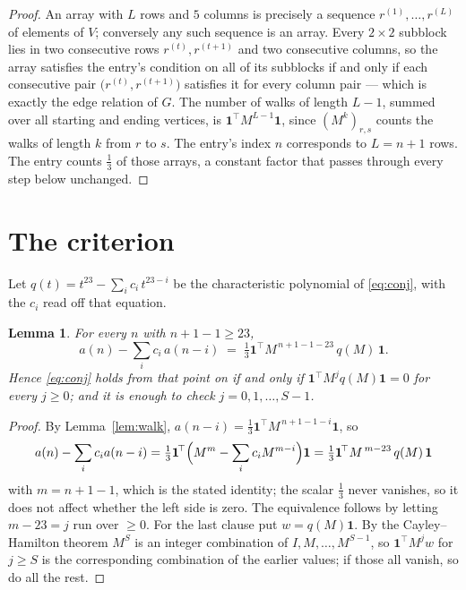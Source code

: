 \documentclass[11pt,a4paper]{article}
\theoremstyle{plain}
\newtheorem{lemma}[theorem]{Lemma}
\theoremstyle{definition}
\begin{document}
\begin{proof}
An array with $L$ rows and $5$ columns is precisely a sequence
$r^{(1)},\dots,r^{(L)}$ of elements of $V$; conversely any such sequence is an array.
Every $2\times2$ subblock lies in two consecutive rows $r^{(t)},r^{(t+1)}$ and two
consecutive columns, so the array satisfies the entry's condition on all of its subblocks
if and only if each consecutive pair $\bigl(r^{(t)},r^{(t+1)}\bigr)$ satisfies it for
every column pair --- which is exactly the edge relation of $G$. The number of walks of
length $L-1$, summed over all starting and ending vertices, is
$\mathbf{1}^{\!\top}M^{L-1}\mathbf{1}$, since $(M^{k})_{r,s}$ counts the walks of
length $k$ from $r$ to $s$. The entry's index $n$ corresponds to $L=n+1$ rows. The entry counts $\tfrac1{3}$ of those arrays, a constant factor that passes through every step below unchanged.
\end{proof}

\section{The criterion}

Let $q(t)=t^{23}-\sum_i c_i\,t^{23-i}$ be the characteristic polynomial of
\eqref{eq:conj}, with the $c_i$ read off that equation.

\begin{lemma}\label{lem:crit}
For every $n$ with $n+1-1\ge23$,
\[
a(n)-\sum_i c_i\,a(n-i)\;=\;\tfrac1{3}\mathbf{1}^{\!\top}M^{\,n+1-1-23}\,q(M)\,\mathbf{1} .
\]
Hence \eqref{eq:conj} holds from that point on if and only if
$\mathbf{1}^{\!\top}M^{j}q(M)\mathbf{1}=0$ for every $j\ge0$; and it is enough to check
$j=0,1,\dots,S-1$.
\end{lemma}

\begin{proof}
By Lemma~\ref{lem:walk}, $a(n-i)=\tfrac1{3}\mathbf{1}^{\!\top}M^{\,n+1-1-i}\mathbf{1}$, so
\[
a(n)-\sum_i c_i a(n-i)
=\tfrac1{3}\mathbf{1}^{\!\top}\Bigl(M^{m}-\sum_i c_i M^{m-i}\Bigr)\mathbf{1}
=\tfrac1{3}\mathbf{1}^{\!\top}M^{\,m-23}\,q(M)\,\mathbf{1}
\]
with $m=n+1-1$, which is the stated identity; the scalar $\tfrac1{3}$ never vanishes, so
it does not affect whether the left side is zero. The equivalence follows by letting
$m-23=j$ run over $\ge0$. For the last clause put $w=q(M)\mathbf{1}$. By the
Cayley--Hamilton theorem $M^{S}$ is an integer combination of $I,M,\dots,M^{S-1}$, so
$\mathbf{1}^{\!\top}M^{j}w$ for $j\ge S$ is the corresponding combination of the earlier
values; if those all vanish, so do all the rest.
\end{proof}
\end{document}
